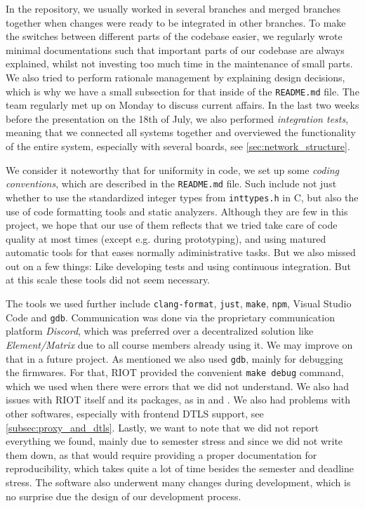 \documentclass[acmtog, language=english, nonacm]{acmart}
\begin{document}
    In the repository, we usually worked in several branches and merged branches together when changes were ready to be integrated in other branches. To make the switches between different parts of the codebase easier, we regularly wrote minimal documentations such that important parts of our codebase are always explained, whilst not investing too much time in the maintenance of small parts. We also tried to perform rationale management by explaining design decisions, which is why we have a small subsection for that inside of the \texttt{README.md} file. The team regularly met up on Monday to discuss current affairs. In the last two weeks before the presentation on the 18th of July, we also performed \emph{integration tests}, meaning that we connected all systems together and overviewed the functionality of the entire system, especially with several boards, see \cref{sec:network_structure}.

    We consider it noteworthy that for uniformity in code, we set up some \emph{coding conventions}, which are described in the \texttt{README.md} file. Such include not just whether to use the standardized integer types from \texttt{inttypes.h} in C, but also the use of code formatting tools and static analyzers. Although they are few in this project, we hope that our use of them reflects that we tried take care of code quality at most times (except e.g. during prototyping), and using matured automatic tools for that eases normally adiministrative tasks. But we also missed out on a few things: Like developing tests and using continuous integration. But at this scale these tools did not seem necessary.
    
    The tools we used further include \texttt{clang-format}, \texttt{just}, \texttt{make}, \texttt{npm}, Visual Studio Code and \texttt{gdb}. Communication was done via the proprietary communication platform \emph{Discord}, which was preferred over a decentralized solution like \emph{Element/Matrix} due to all course members already using it. We may improve on that in a future project. As mentioned we also used \texttt{gdb}, mainly for debugging the firmwares. For that, RIOT provided the convenient \texttt{make debug} command, which we used when there were errors that we did not understand. We also had issues with RIOT itself and its packages, as in \cite{first-riot-issue} and \cite{second-riot-issue}. We also had problems with other softwares, especially with frontend DTLS support, see \cref{subsec:proxy_and_dtls}. Lastly, we want to note that we did not report everything we found, mainly due to semester stress and since we did not write them down, as that would require providing a proper documentation for reproducibility, which takes quite a lot of time besides the semester and deadline stress. The software also underwent many changes during development, which is no surprise due the design of our development process.
\end{document}
